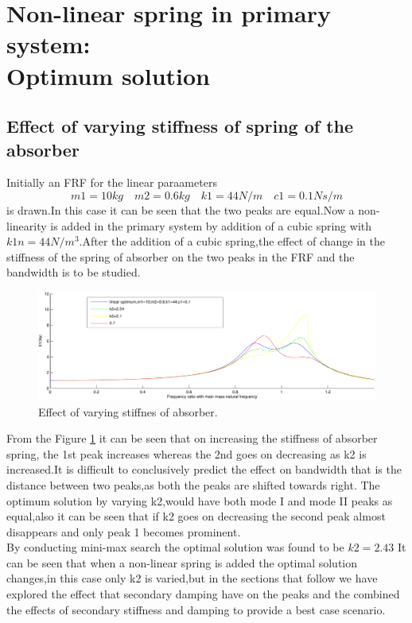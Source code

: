 \section{Non-linear spring in primary system:\\ Optimum solution}
\subsection{Effect of varying stiffness of spring of the absorber } 
Initially an FRF for the linear paraameters $$ m1=10 kg\quad m2=0.6kg\quad k1=44 N/m\quad c1=0.1 Ns/m $$ is drawn.In this case it can be seen that the two peaks are equal.Now a non-linearity is added in the primary system by addition of a cubic spring with $k1n=44 N/m^3$.After the addition of a cubic spring,the effect of change in the stiffness of the spring of absorber on the two peaks in the FRF and the bandwidth is to be studied.

\begin{figure}[h!]
\includegraphics[width=\textwidth,height=0.5\textwidth]{"figures/nonlinearity_primaryymass_3_effect of secondaryspring"}
  \caption{Effect of varying stiffnes of absorber.}
  \label{fig:varying stiffnes of absorber}
  \end{figure}
From the Figure \ref{fig:varying stiffnes of absorber} it can be seen that on increasing the stiffness of absorber spring, the 1st peak increases whereas the 2nd  goes on decreasing as k2 is increased.It is difficult to conclusively predict the effect on bandwidth that is the distance between two peaks,as both the peaks are shifted towards right.
The optimum solution by varying k2,would have both mode I and mode II peaks as equal,also it can be seen that if k2 goes on decreasing the second peak almost disappears and only peak 1 becomes prominent.\\
By conducting mini-max search the optimal solution was found to be $k2=2.43$ It can be seen that when a non-linear spring is added the optimal solution changes,in this case only k2 is varied,but in the sections that follow we have explored the effect that secondary damping have on the peaks and the combined the effects of secondary stiffness and damping to provide a best case scenario.\\
  


